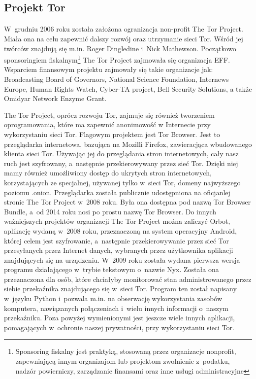 \subsection{Projekt Tor}\paragraph{}
\indent W~grudniu 2006 roku została założona ogranizacja non-profit The Tor Project. Miała ona na celu zapewnić dalszy rozwój oraz utrzymanie sieci Tor. Wśród jej twórców znajdują się m.in. Roger Dingledine i~Nick Mathewson\cite{form990}. Początkowo sponsoringiem fiskalnym\footnote{Sponsoring fiskalny jest praktyką, stosowaną przez organizacje nonprofit, zapewniającą innym organizajom lub projektom zwolnienie z~podatku, nadzór powierniczy, zarządzanie finansami oraz inne usługi administracyjne\cite{fiscal_sponsorship}} The Tor Project zajmowała się organizacja EFF\cite{eff_press}. Wsparciem finansowym projektu zajmowały się takie organizacje jak: Broadcasting Board of Governors, National Science Foundation, Internews Europe, Human Rights Watch, Cyber-TA project, Bell Security Solutions, a także Omidyar Network Enzyme Grant\cite{torproject_sponsors}.

The Tor Project, oprócz rozwoju Tor, zajmuje się również tworzeniem oprogramowania, które ma zapewnić anonimowość w Internecie przy wykorzystaniu sieci Tor. Flagowym projektem jest Tor Browser. Jest to przeglądarka internetowa, bazująca na Mozilli Firefox, zawieracjąca wbudowanego klienta sieci Tor. Używając jej do przeglądania stron internetowych, cały nasz ruch jest szyfrowany, a~następnie przekierowywany przez sieć Tor. Dzięki niej mamy również umożliwiony dostęp do ukrytych stron internetowych, korzystających ze specjalnej, używanej tylko w~sieci Tor, domeny najwyższego poziomu .onion\cite{torbrowser_design}. Przeglądarka została publicznie udostępniona na oficjanlej stronie The Tor Project w~2008 roku\cite{archive1}. Była ona dostępna pod nazwą Tor Browser Bundle, a~od 2014 roku nosi po prostu nazwę Tor Browser\cite{archive2}. Do innych ważniejszych projektów organizacji The Tor Project można zaliczyć Orbot, aplikację wydaną w~2008 roku, przeznaczoną na system operacyjny Android, której celem jest szyfrowanie, a~następnie przekierowywanie przez sieć Tor przesyłanych przez Internet danych, wybranych przez użytkownika aplikacji znajdujących się na urządzeniu\cite{orbot}. W~2009 roku została wydana pierwsza wersja programu działającego w~trybie tekstowym o~nazwie Nyx\cite{nyx_changelog}. Została ona przeznaczona dla osób, które chciałyby monitorować stan administrowanego przez siebie przekaźnika znajdującego się w~sieci Tor. Program ten został napisany w~języku Python i~pozwala m.in. na obserwację wykorzystania zasobów komputera, nawiązanych połączeniach i~wielu innych informacji o~naszym przekaźniku\cite{nyx}. Poza powyżej wymienionymi jest jeszcze wiele innych aplikacji, pomagających w~ochronie naszej prywatności, przy wykorzystaniu sieci Tor\cite{torproject_projects}.

